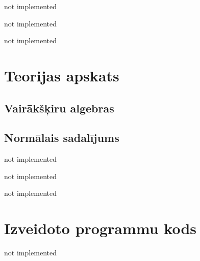 \documentclass[singlespacing, latexmargins]{ludis}
\begin{document}
\maketitle

\begin{abstract-lv}
    not implemented

\end{abstract-lv}

\begin{abstract-en}
    not implemented

\end{abstract-en}

\tableofcontents

not implemented



\chapter{Teorijas apskats}

\section{Vairākšķiru algebras}

\section{Normālais sadalījums}

not implemented

not implemented

not implemented


\appendix
\chapter{Izveidoto programmu kods}
not implemented
\end{document}
